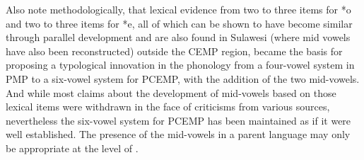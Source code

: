 Also note methodologically, that lexical evidence from two to
three items for *o
and two to three items for *e,
all of which can be shown to have become similar through parallel
development and are also found in Sulawesi (where mid vowels have also been
reconstructed) outside the CEMP region,
became the basis for proposing a typological innovation in the
phonology from a four-vowel system in PMP to a six-vowel system
for PCEMP, with the addition of the two mid-vowels.
And while most claims about the development of mid-vowels based
on those lexical items were withdrawn in the face of criticisms
from various sources, nevertheless the six-vowel system for PCEMP has been maintained
as if it were well established.
The presence of the mid-vowels in a parent language may only
be appropriate at the level of .
